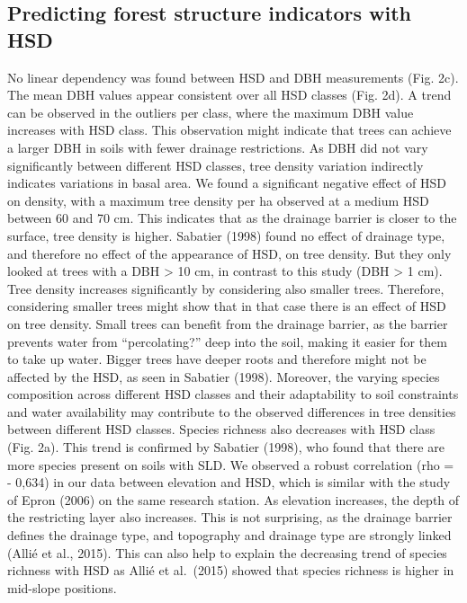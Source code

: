 \documentclass[fleqn,10pt]{latex/stylish_article} %
\begin{document}
\hypertarget{predicting-forest-structure-indicators-with-hsd}{%
\subsection{Predicting forest structure indicators with HSD}\label{predicting-forest-structure-indicators-with-hsd}}

No linear dependency was found between HSD and DBH measurements (Fig. 2c). The mean DBH values appear consistent over all HSD classes (Fig. 2d). A trend can be observed in the outliers per class, where the maximum DBH value increases with HSD class. This observation might indicate that trees can achieve a larger DBH in soils with fewer drainage restrictions.
As DBH did not vary significantly between different HSD classes, tree density variation indirectly indicates variations in basal area. We found a significant negative effect of HSD on density, with a maximum tree density per ha observed at a medium HSD between 60 and 70 cm. This indicates that as the drainage barrier is closer to the surface, tree density is higher. Sabatier (1998) found no effect of drainage type, and therefore no effect of the appearance of HSD, on tree density. But they only looked at trees with a DBH \textgreater{} 10 cm, in contrast to this study (DBH \textgreater{} 1 cm). Tree density increases significantly by considering also smaller trees. Therefore, considering smaller trees might show that in that case there is an effect of HSD on tree density. Small trees can benefit from the drainage barrier, as the barrier prevents water from \enquote{percolating?} deep into the soil, making it easier for them to take up water. Bigger trees have deeper roots and therefore might not be affected by the HSD, as seen in Sabatier (1998). Moreover, the varying species composition across different HSD classes and their adaptability to soil constraints and water availability may contribute to the observed differences in tree densities between different HSD classes.
Species richness also decreases with HSD class (Fig. 2a). This trend is confirmed by Sabatier (1998), who found that there are more species present on soils with SLD.
We observed a robust correlation (rho = - 0,634) in our data between elevation and HSD, which is similar with the study of Epron (2006) on the same research station. As elevation increases, the depth of the restricting layer also increases. This is not surprising, as the drainage barrier defines the drainage type, and topography and drainage type are strongly linked (Allié et al., 2015). This can also help to explain the decreasing trend of species richness with HSD as Allié et al.~(2015) showed that species richness is higher in mid-slope positions.
\end{document}

